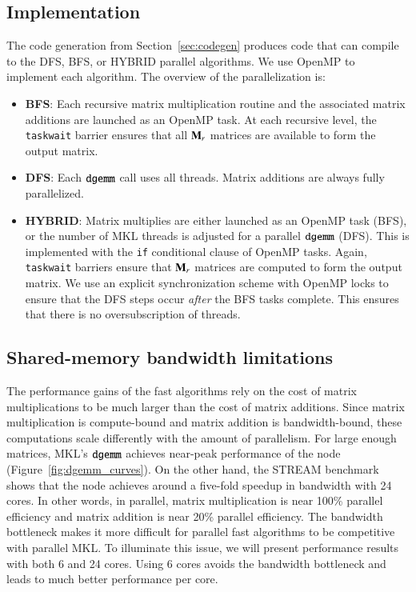 \documentclass[preprint]{sigplanconf}
\newcommand{\M}[2][]{{\bm{#1\mathbf{\MakeUppercase{#2}}}}}
\begin{document}
\subsection{Implementation}
\label{sec:par_implementation}

The code generation from Section~\ref{sec:codegen} produces code that can compile to the DFS, BFS, or HYBRID parallel algorithms.
We use OpenMP to implement each algorithm.
The overview of the parallelization is:
\begin{itemize}
\item \textbf{BFS}: Each recursive matrix multiplication routine and the associated matrix additions are launched as an OpenMP task.
At each recursive level, the \texttt{taskwait} barrier ensures that all $\M{M}_r$ matrices are available to form the output matrix.
\item \textbf{DFS}: Each $\texttt{dgemm}$ call uses all threads.
Matrix additions are always fully parallelized.
\item \textbf{HYBRID}:
Matrix multiplies are either launched as an OpenMP task (BFS), or the number of MKL threads is adjusted for a parallel $\texttt{dgemm}$ (DFS).
This is implemented with the \texttt{if} conditional clause of OpenMP tasks.
Again, \texttt{taskwait} barriers ensure that $\M{M}_r$ matrices are computed to form the output matrix.
We use an explicit synchronization scheme with OpenMP locks to ensure that the DFS steps occur \emph{after} the BFS tasks complete.
This ensures that there is no oversubscription of threads.
\end{itemize}

\subsection{Shared-memory bandwidth limitations}
\label{sec:bandwidth}

The performance gains of the fast algorithms rely on the cost of matrix multiplications to be much larger than the cost of matrix additions.
Since matrix multiplication is compute-bound and matrix addition is bandwidth-bound, these computations scale differently with the amount of parallelism.
For large enough matrices, MKL's $\texttt{dgemm}$ achieves near-peak performance of the node (Figure~\ref{fig:dgemm_curves}).
On the other hand, the STREAM benchmark \cite{mccalpin1995survey} shows that the node achieves around a five-fold speedup in bandwidth with 24 cores.
In other words, in parallel, matrix multiplication is near 100\% parallel efficiency and matrix addition is near 20\% parallel efficiency.
The bandwidth bottleneck makes it more difficult for parallel fast algorithms to be competitive with parallel MKL.
To illuminate this issue, we will present performance results with both 6 and 24 cores.
Using 6 cores avoids the bandwidth bottleneck and leads to much better performance per core.
\end{document}
